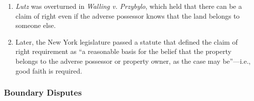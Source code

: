 \begin{enumerate}
\begin{enumerate}
        often grant title to good faith trespassers but not to trespassers who 
        know the land does not belong to them.\footnote{Casebook pp. 132--133.}
        \item \textbf{Aggressive trespass standard} (``I knew I didn't own it, 
        but I intended to make it mine''): to qualify as adverse possessors, 
        occupants must intend to take the property for themselves. Courts 
        sometimes require the occupant to compensate the owner for the fair 
        market value of the property.
    \end{enumerate}
    \item \emph{Lutz} was overturned in \emph{Walling v. Przybylo}, which 
    held that there can be a claim of right even if the adverse possessor 
    knows that the land belongs to someone else.
    \item Later, the New York legislature passed a statute that defined the 
    claim of right requirement as ``a reasonable basis for the belief that the 
    property belongs to the adverse possessor or property owner, as the case 
    may be''---i.e., good faith is required.
\end{enumerate}

\subsubsection{Boundary Disputes}

